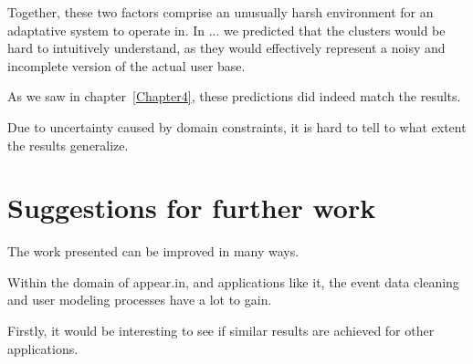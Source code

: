 Together, these two factors comprise an unusually harsh environment for an adaptative system to operate in. In ... we predicted that the clusters would be hard to intuitively understand, as they would effectively represent a noisy and incomplete version of the actual user base.

As we saw in chapter~\ref{Chapter4}, these predictions did indeed match the results.

Due to uncertainty caused by domain constraints, it is hard to tell to what extent the results generalize.


\section{Suggestions for further work} %
\label{conclusion:sec:further_work}

The work presented can be improved in many ways.

Within the domain of appear.in, and applications like it, the event data cleaning and user modeling processes have a lot to gain.

Firstly, it would be interesting to see if similar results are achieved for other applications.
